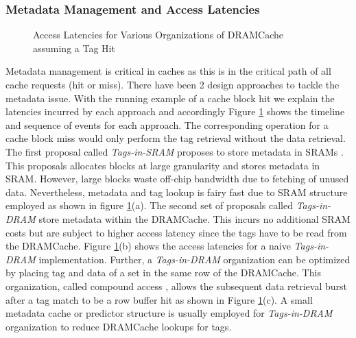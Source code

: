 \subsubsection{Metadata Management and Access Latencies}
\begin{figure}[!htb]
	\centering
	\def\svgwidth{\columnwidth}
	
	\caption{Access Latencies for Various Organizations of DRAMCache assuming a Tag Hit}
	\label{fig:dramcache-lat}
\end{figure}
Metadata management is critical in caches as this is in the critical path of all cache requests (hit or miss). There have been 2 design approaches to tackle the metadata issue. With the running example of a cache block hit we explain the latencies incurred by each approach and accordingly Figure \ref{fig:dramcache-lat} shows the timeline and sequence of events for each approach. The corresponding operation for a cache block miss would only perform the tag retrieval without the data retrieval. The first proposal called \textit{Tags-in-SRAM} proposes to store metadata in SRAMs \cite{footprint}. This proposals allocates blocks at large granularity and stores metadata in SRAM. However, large blocks waste off-chip bandwidth due to fetching of unused data. Nevertheless, metadata and tag lookup is fairy fast due to SRAM structure employed as shown in figure \ref{fig:dramcache-lat}(a). The second set of proposals called \textit{Tags-in-DRAM} \cite{loh-hill,alloy,bimodal,atcache} store metadata within the DRAMCache. This incurs no additional SRAM costs but are subject to higher access latency since the tags have to be read from the DRAMCache. Figure \ref{fig:dramcache-lat}(b) shows the access latencies for a naive \textit{Tags-in-DRAM} implementation. Further, a \textit{Tags-in-DRAM} organization can be optimized by placing tag and data of a set in the same row of the DRAMCache. This organization, called compound access \cite{loh-hill}, allows the subsequent data retrieval burst after a tag match to be a row buffer hit as shown in Figure \ref{fig:dramcache-lat}(c). A small metadata cache \cite{atcache} or predictor \cite{loh-hill} structure is usually employed for \textit{Tags-in-DRAM} organization to reduce DRAMCache lookups for tags.
